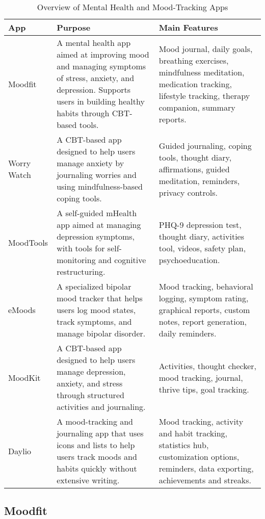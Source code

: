 \FloatBarrier
\begin{table}[ht]
\centering
\begin{tabular}{|p{2cm}|p{6cm}|p{6cm}|}
\hline
\textbf{App} & \textbf{Purpose} & \textbf{Main Features} \\ \hline
Moodfit & A mental health app aimed at improving mood and managing symptoms of stress, anxiety, and depression. Supports users in building healthy habits through CBT-based tools. & Mood journal, daily goals, breathing exercises, mindfulness meditation, medication tracking, lifestyle tracking, therapy companion, summary reports. \\ \hline
Worry Watch & A CBT-based app designed to help users manage anxiety by journaling worries and using mindfulness-based coping tools. & Guided journaling, coping tools, thought diary, affirmations, guided meditation, reminders, privacy controls. \\ \hline
MoodTools & A self-guided mHealth app aimed at managing depression symptoms, with tools for self-monitoring and cognitive restructuring. & PHQ-9 depression test, thought diary, activities tool, videos, safety plan, psychoeducation. \\ \hline
eMoods & A specialized bipolar mood tracker that helps users log mood states, track symptoms, and manage bipolar disorder. & Mood tracking, behavioral logging, symptom rating, graphical reports, custom notes, report generation, daily reminders. \\ \hline
MoodKit & A CBT-based app designed to help users manage depression, anxiety, and stress through structured activities and journaling. & Activities, thought checker, mood tracking, journal, thrive tips, goal tracking. \\ \hline
Daylio & A mood-tracking and journaling app that uses icons and lists to help users track moods and habits quickly without extensive writing. & Mood tracking, activity and habit tracking, statistics hub, customization options, reminders, data exporting, achievements and streaks. \\ \hline
\end{tabular}
\caption{Overview of Mental Health and Mood-Tracking Apps}
\label{tab:overview_mood_apps}
\end{table}
\FloatBarrier

\subsection{Moodfit}

